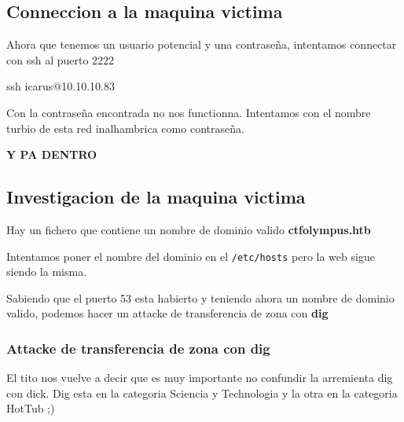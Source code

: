 \documentclass{assets/ipesethesis}
\newenvironment{Shaded}{\begin{snugshade}}{\end{snugshade}}
\newcommand{\FunctionTok}[1]{\textcolor[rgb]{0.00,0.00,0.00}{#1}}
\newcommand{\NormalTok}[1]{#1}
\begin{document}
\hypertarget{conneccion-a-la-maquina-victima}{%
\subsection*{Conneccion a la maquina victima}\label{conneccion-a-la-maquina-victima}}

Ahora que tenemos un usuario potencial y una contraseña, intentamos connectar con ssh al puerto 2222

\begin{Shaded}
\begin{Highlighting}[]
\FunctionTok{ssh}\NormalTok{ icarus@10.10.10.83}
\end{Highlighting}
\end{Shaded}

Con la contraseña encontrada no nos functionna.
Intentamos con el nombre turbio de esta red inalhambrica como contraseña.

\textbf{Y PA DENTRO}

\hypertarget{investigacion-de-la-maquina-victima}{%
\subsection*{Investigacion de la maquina victima}\label{investigacion-de-la-maquina-victima}}

Hay un fichero que contiene un nombre de dominio valido \textbf{ctfolympus.htb}

Intentamos poner el nombre del dominio en el \texttt{/etc/hosts} pero la web sigue siendo la misma.

Sabiendo que el puerto 53 esta habierto y teniendo ahora un nombre de dominio valido, podemos
hacer un attacke de transferencia de zona con \textbf{dig}

\hypertarget{attacke-de-transferencia-de-zona-con-dig}{%
\subsubsection*{Attacke de transferencia de zona con dig}\label{attacke-de-transferencia-de-zona-con-dig}}

El tito nos vuelve a decir que es muy importante no confundir la arremienta dig con dick. Dig esta en
la categoria Sciencia y Technologia y la otra en la categoria HotTub ;)
\end{document}
